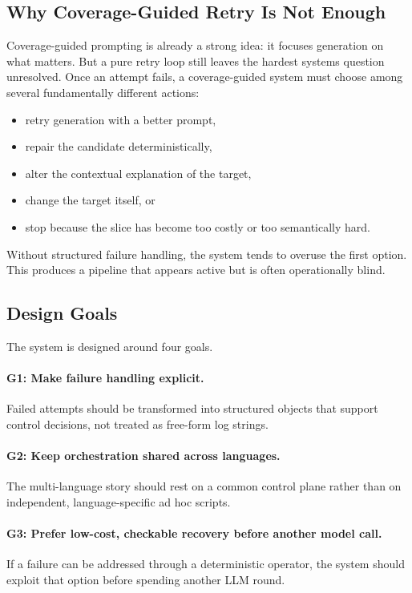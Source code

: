 \documentclass[10pt]{article}
\begin{document}
\subsection{Why Coverage-Guided Retry Is Not Enough}

Coverage-guided prompting is already a strong idea: it focuses generation on what matters. But a pure retry loop still leaves the hardest systems question unresolved. Once an attempt fails, a coverage-guided system must choose among several fundamentally different actions:

\begin{itemize}[leftmargin=1.4em]
    \item retry generation with a better prompt,
    \item repair the candidate deterministically,
    \item alter the contextual explanation of the target,
    \item change the target itself, or
    \item stop because the slice has become too costly or too semantically hard.
\end{itemize}

Without structured failure handling, the system tends to overuse the first option. This produces a pipeline that appears active but is often operationally blind.

\subsection{Design Goals}

The system is designed around four goals.

\paragraph{G1: Make failure handling explicit.}
Failed attempts should be transformed into structured objects that support control decisions, not treated as free-form log strings.

\paragraph{G2: Keep orchestration shared across languages.}
The multi-language story should rest on a common control plane rather than on independent, language-specific ad hoc scripts.

\paragraph{G3: Prefer low-cost, checkable recovery before another model call.}
If a failure can be addressed through a deterministic operator, the system should exploit that option before spending another LLM round.
\end{document}
